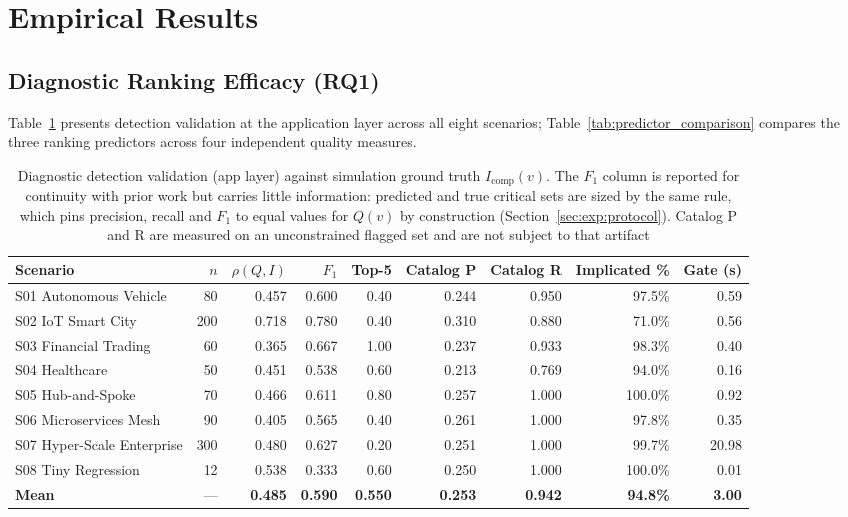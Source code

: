 \section{Empirical Results}
\label{sec:results}

\subsection{Diagnostic Ranking Efficacy (RQ1)}
\label{sec:results:detection}

Table~\ref{tab:detection_results} presents detection validation at the application layer across all eight scenarios; Table~\ref{tab:predictor_comparison} compares the three ranking predictors across four independent quality measures.

\begin{table}[htbp]
\centering
\footnotesize
\setlength{\tabcolsep}{3pt}
\caption{Diagnostic detection validation (app layer) against simulation ground truth $I_{\text{comp}}(v)$. The $F_1$ column is reported for continuity with prior work but carries little information: predicted and true critical sets are sized by the same rule, which pins precision, recall and $F_1$ to equal values for $Q(v)$ by construction (Section~\ref{sec:exp:protocol}). Catalog P and R are measured on an unconstrained flagged set and are not subject to that artifact}
\label{tab:detection_results}
\begin{tabular}{lrrrrrrrr}
\toprule
\textbf{Scenario} & $n$ & $\rho(Q, I)$ & $F_1$ & \textbf{Top-5} & \textbf{Catalog P} & \textbf{Catalog R} & \textbf{Implicated \%} & \textbf{Gate (s)} \\
\midrule
S01 Autonomous Vehicle & 80 & 0.457 & 0.600 & 0.40 & 0.244 & 0.950 & 97.5\% & 0.59 \\
S02 IoT Smart City & 200 & 0.718 & 0.780 & 0.40 & 0.310 & 0.880 & 71.0\% & 0.56 \\
S03 Financial Trading & 60 & 0.365 & 0.667 & 1.00 & 0.237 & 0.933 & 98.3\% & 0.40 \\
S04 Healthcare & 50 & 0.451 & 0.538 & 0.60 & 0.213 & 0.769 & 94.0\% & 0.16 \\
S05 Hub-and-Spoke & 70 & 0.466 & 0.611 & 0.80 & 0.257 & 1.000 & 100.0\% & 0.92 \\
S06 Microservices Mesh & 90 & 0.405 & 0.565 & 0.40 & 0.261 & 1.000 & 97.8\% & 0.35 \\
S07 Hyper-Scale Enterprise & 300 & 0.480 & 0.627 & 0.20 & 0.251 & 1.000 & 99.7\% & 20.98 \\
S08 Tiny Regression & 12 & 0.538 & 0.333 & 0.60 & 0.250 & 1.000 & 100.0\% & 0.01 \\
\midrule
\textbf{Mean} & --- & \textbf{0.485} & \textbf{0.590} & \textbf{0.550} & \textbf{0.253} & \textbf{0.942} & \textbf{94.8\%} & \textbf{3.00} \\
\bottomrule
\end{tabular}
\end{table}

